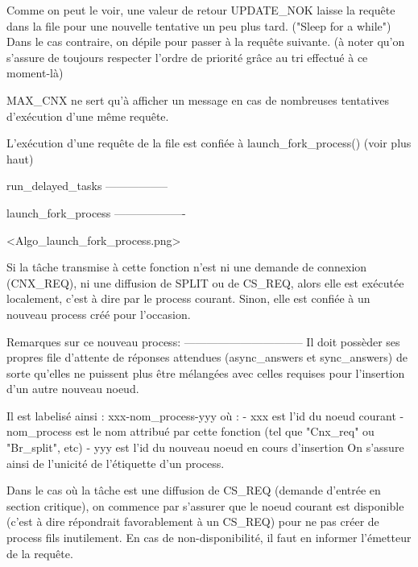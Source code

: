 Comme on peut le voir, une valeur de retour UPDATE_NOK laisse la requête dans la file pour une nouvelle tentative un peu
plus tard. ("Sleep for a while") Dans le cas contraire, on dépile pour passer à la requête suivante. (à noter qu'on
s'assure de toujours respecter l'ordre de priorité grâce au tri effectué à ce moment-là)

MAX_CNX ne sert qu'à afficher un message en cas de nombreuses tentatives d'exécution d'une même requête.

L'exécution d'une requête de la file est confiée à launch_fork_process() (voir plus haut)

run_delayed_tasks
-----------------


launch_fork_process
-------------------

<Algo_launch_fork_process.png>

Si la tâche transmise à cette fonction n'est ni une demande de connexion
(CNX_REQ), ni une diffusion de SPLIT ou de CS_REQ, alors elle est exécutée
localement, c'est à dire par le process courant.
Sinon, elle est confiée à un nouveau process créé pour l'occasion.

Remarques sur ce nouveau process:
--------------------------------
Il doit possèder ses propres file d'attente de réponses attendues (async_answers
et sync_answers) de sorte qu'elles ne puissent plus être mélangées avec celles
requises pour l'insertion d'un autre nouveau noeud.

Il est labelisé ainsi : xxx-nom_process-yyy où :
  - xxx est l'id du noeud courant
  - nom_process est le nom attribué par cette fonction (tel que "Cnx_req" ou "Br_split", etc)
  - yyy est l'id du nouveau noeud en cours d'insertion
On s'assure ainsi de l'unicité de l'étiquette d'un process.

Dans le cas où la tâche est une diffusion de CS_REQ (demande d'entrée en section
critique), on commence par s'assurer que le noeud courant est disponible (c'est
à dire répondrait favorablement à un CS_REQ) pour ne pas créer de process fils
inutilement. En cas de non-disponibilité, il faut en informer l'émetteur de la
requête.

